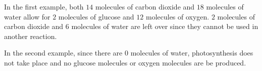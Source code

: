 In the first example, both $14$ molecules of carbon dioxide and $18$ molecules of water allow for $2$ molecules of glucose and $12$ molecules of oxygen. $2$ molecules of carbon dioxide and $6$ molecules of water are left over since they cannot be used in another reaction.


In the second example, since there are $0$ molecules of water, photosynthesis does not take place and no glucose molecules or oxygen molecules are be produced.
